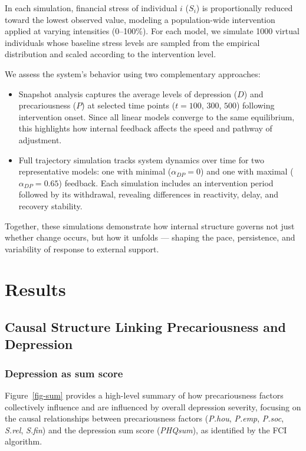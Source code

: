 \documentclass[
]{article}
\begin{document}
In each simulation, financial stress of individual \(i\) (\(S_i\)) is
proportionally reduced toward the lowest observed value, modeling a
population-wide intervention applied at varying intensities (0--100\%).
For each model, we simulate 1000 virtual individuals whose baseline
stress levels are sampled from the empirical distribution and scaled
according to the intervention level.

We assess the system's behavior using two complementary approaches:

\begin{itemize}
\item
  Snapshot analysis captures the average levels of depression (\(D\))
  and precariousness (\(P\)) at selected time points (\(t = 100\),
  \(300\), \(500\)) following intervention onset. Since all linear
  models converge to the same equilibrium, this highlights how internal
  feedback affects the speed and pathway of adjustment.
\item
  Full trajectory simulation tracks system dynamics over time for two
  representative models: one with minimal (\(\alpha_{DP} = 0\)) and one
  with maximal (\(\alpha_{DP} = 0.65\)) feedback. Each simulation
  includes an intervention period followed by its withdrawal, revealing
  differences in reactivity, delay, and recovery stability.
\end{itemize}

Together, these simulations demonstrate how internal structure governs
not just whether change occurs, but how it unfolds --- shaping the pace,
persistence, and variability of response to external support.

\section{Results}\label{results}

\subsection{Causal Structure Linking Precariousness and
Depression}\label{causal-structure-linking-precariousness-and-depression}

\subsubsection{Depression as sum score}\label{depression-as-sum-score}

Figure~\ref{fig-sum} provides a high-level summary of how precariousness
factors collectively influence and are influenced by overall depression
severity, focusing on the causal relationships between precariousness
factors (\emph{P.hou}, \emph{P.emp}, \emph{P.soc}, \emph{S.rel},
\emph{S.fin}) and the depression sum score (\emph{PHQsum}), as
identified by the FCI algorithm.
\end{document}
